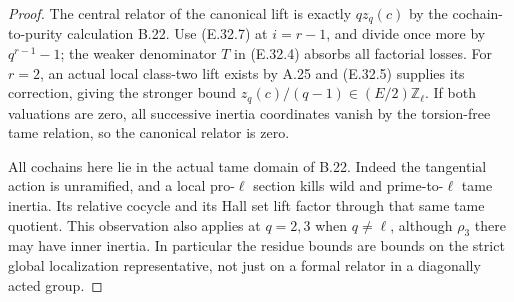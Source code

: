 \begin{proof}
The central relator of the canonical lift is exactly $qz_q(c)$ by
the cochain-to-purity calculation B.22.  Use (E.32.7) at $i=r-1$,
and divide once more by $q^{r-1}-1$; the weaker denominator $T$
in (E.32.4) absorbs all factorial losses.  For $r=2$, an actual local
class-two lift exists by A.25 and (E.32.5) supplies its correction,
giving the stronger bound $z_q(c)/(q-1)\in(E/2)\mathbb Z_\ell$.
If both valuations are zero, all successive inertia coordinates vanish
by the torsion-free tame relation, so the canonical relator is zero.

All cochains here lie in the actual tame domain of B.22.  Indeed the
tangential action is unramified, and a local pro-$\ell$ section kills
wild and prime-to-$\ell$ tame inertia.  Its relative cocycle and its
Hall set lift factor through that same tame quotient.  This observation
also applies at $q=2,3$ when $q\ne\ell$, although $\rho_3$ there may
have inner inertia.  In particular the residue bounds are bounds on
the strict global localization representative, not just on a formal
relator in a diagonally acted group.
\end{proof}

